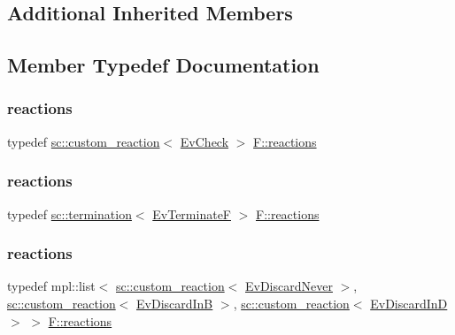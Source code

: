\subsection*{Additional Inherited Members}


\subsection{Member Typedef Documentation}
\mbox{\label{struct_f_a476174f8a8927114c00816d11877c50f}} 
\subsubsection{\texorpdfstring{reactions}{reactions}\hspace{0.1cm}{\footnotesize\ttfamily [1/3]}}
{\footnotesize\ttfamily typedef \mbox{\hyperlink{classboost_1_1statechart_1_1custom__reaction}{sc\+::custom\+\_\+reaction}}$<$ \mbox{\hyperlink{struct_ev_check}{Ev\+Check}} $>$ \mbox{\hyperlink{struct_f_a70eacc9bcbabcf07fc24f5a7fefce855}{F\+::reactions}}}

\mbox{\label{struct_f_add001eab83d0f8cff9a94bf6447c5aa1}} 
\subsubsection{\texorpdfstring{reactions}{reactions}\hspace{0.1cm}{\footnotesize\ttfamily [2/3]}}
{\footnotesize\ttfamily typedef \mbox{\hyperlink{classboost_1_1statechart_1_1termination}{sc\+::termination}}$<$ \mbox{\hyperlink{struct_ev_terminate_f}{Ev\+TerminateF}} $>$ \mbox{\hyperlink{struct_f_a70eacc9bcbabcf07fc24f5a7fefce855}{F\+::reactions}}}

\mbox{\label{struct_f_a70eacc9bcbabcf07fc24f5a7fefce855}} 
\subsubsection{\texorpdfstring{reactions}{reactions}\hspace{0.1cm}{\footnotesize\ttfamily [3/3]}}
{\footnotesize\ttfamily typedef mpl\+::list$<$ \mbox{\hyperlink{classboost_1_1statechart_1_1custom__reaction}{sc\+::custom\+\_\+reaction}}$<$ \mbox{\hyperlink{struct_ev_discard_never}{Ev\+Discard\+Never}} $>$, \mbox{\hyperlink{classboost_1_1statechart_1_1custom__reaction}{sc\+::custom\+\_\+reaction}}$<$ \mbox{\hyperlink{struct_ev_discard_in_b}{Ev\+Discard\+InB}} $>$, \mbox{\hyperlink{classboost_1_1statechart_1_1custom__reaction}{sc\+::custom\+\_\+reaction}}$<$ \mbox{\hyperlink{struct_ev_discard_in_d}{Ev\+Discard\+InD}} $>$ $>$ \mbox{\hyperlink{struct_f_a70eacc9bcbabcf07fc24f5a7fefce855}{F\+::reactions}}}



